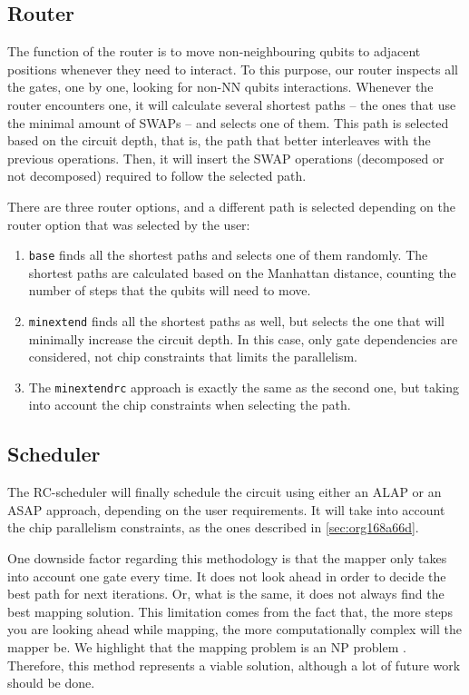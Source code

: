 \subsection{Router}
\label{sec:org18105df}
The function of the router is to move non-neighbouring qubits to adjacent positions whenever they need to interact. To this purpose, our router inspects all the gates, one by one, looking for non-NN qubits interactions.
Whenever the router encounters one, it will calculate several shortest paths -- the ones that use the minimal amount of SWAPs -- and selects one of them. This path is selected based on the circuit depth, that is, the path that better interleaves with the previous operations.
Then, it will insert the SWAP operations (decomposed or not decomposed) required to follow the selected path.



There are three router options, and a different path is selected depending on the router option that was selected by the user:

\begin{enumerate}
\item \texttt{base} finds all the shortest paths and selects one of them randomly. The shortest paths are calculated based on the Manhattan distance, counting the number of steps that the qubits will need to move.
\item \texttt{minextend} finds all the shortest paths as well, but selects the one that will minimally increase the circuit depth. In this case, only gate dependencies are considered, not chip constraints that limits the parallelism.
\item The \texttt{minextendrc} approach is exactly the same as the second one, but taking into account the chip constraints when selecting the path.
\end{enumerate}


\subsection{Scheduler}
\label{sec:org2ec75f3}

The RC-scheduler will finally schedule the circuit using either an ALAP or an ASAP approach, depending on the user requirements.
It will take into account the chip parallelism constraints, as the ones described in \ref{sec:org168a66d}.

One downside factor regarding this methodology is that the mapper only takes into account one gate every time.
It does not look ahead in order to decide the best path for next iterations.
Or, what is the same, it does not always find the best mapping solution.
This limitation comes from the fact that, the more steps you are looking ahead while mapping, the more computationally complex will the mapper be.
We highlight that the mapping problem is an NP problem \cite{Siraichi_2018}.
Therefore, this method represents a viable solution, although a lot of future work should be done.

